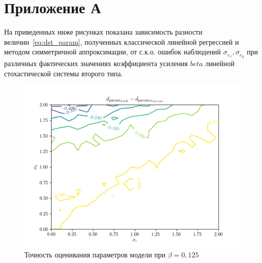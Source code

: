 \renewcommand{\thefigure}{\Asbuk{section}.\arabic{figure}}
\renewcommand{\thetable}{\Asbuk{section}.\arabic{table}}
\renewcommand{\thelstlisting}{\Asbuk{section}.\arabic{lstlisting}}

\chapter*{Приложение А}

\setcounter{section}{1}
\setcounter{figure}{0}
\setcounter{table}{0}
\setcounter{lstlisting}{0}

На приведенных ниже рисунках показана зависимость разности
величин~\eqref{eq:dst_param},
полученных классической линейной регрессией и методом симметричной аппроксимации,
от с.к.о. ошибок наблюдений \( \sigma_{\varepsilon_x}, \sigma_{\varepsilon_y} \) при
различных фактических значениях коэффициента усиления \( beta \)
линейной стохастической системы второго типа.

\begin{figure}[h]
  \centering
  \includegraphics[width=150mm]{fig/linear/param/beta-0,125_param.png}
  \caption{Точность оценивания параметров модели при \( \beta = 0{,}125 \)}
\end{figure}

